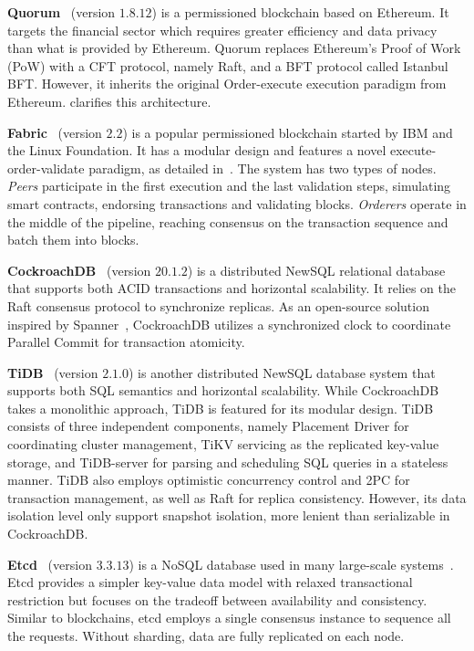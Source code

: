 \textbf{Quorum}~\cite{web:quorum} (version $1.8.12$) is a permissioned blockchain based on Ethereum. It
targets the financial sector which requires greater efficiency and data privacy than what is provided by Ethereum.
Quorum replaces Ethereum's Proof of Work (PoW) with a CFT protocol, namely Raft, and a BFT protocol called
Istanbul BFT. However, it inherits the original Order-execute execution paradigm from Ethereum.  clarifies this architecture. 

\textbf{Fabric}~\cite{androulaki2018hyperledger} (version $2.2$) is a popular permissioned
blockchain started by IBM and the Linux Foundation. It has a modular design and features a novel execute-order-validate paradigm, as detailed in~. The system has two types
of nodes. 
{\em Peers} participate in the first execution and the last validation steps, simulating smart contracts, endorsing transactions and validating blocks. {\em Orderers} operate in the middle of the pipeline, reaching consensus on the transaction sequence and batch them into blocks. 

\textbf{CockroachDB}~\cite{taft2020cockroachdb} (version $20.1.2$) is 
a distributed NewSQL relational database that supports both ACID transactions and horizontal scalability. It relies on the Raft consensus protocol to synchronize replicas. As an open-source solution inspired by Spanner~\cite{corbett2013spanner}, CockroachDB utilizes a synchronized clock to coordinate Parallel Commit for transaction atomicity. 

\textbf{TiDB}~\cite{huang13tidb} (version $2.1.0$) is another distributed NewSQL database system that supports both SQL semantics and horizontal scalability. 
While CockroachDB takes a monolithic approach, TiDB is featured for its modular design. TiDB consists of three independent components, namely Placement Driver for coordinating cluster management, TiKV servicing as the replicated key-value storage, and TiDB-server for parsing and scheduling SQL queries in a stateless manner. 
TiDB also employs optimistic concurrency control and 2PC for transaction management, as well as Raft for replica consistency. However, its data isolation level only support snapshot isolation, more lenient than serializable in CockroachDB. 

\textbf{Etcd}~\cite{web:etcd} (version $3.3.13$) is a NoSQL database used in many large-scale
systems~\cite{web:etcd_user}.  
Etcd provides a simpler key-value data model with relaxed transactional restriction but focuses on the tradeoff between availability and consistency. 
Similar to blockchains, etcd employs a single consensus instance to sequence all the requests.
Without sharding, data are fully replicated on each node.

